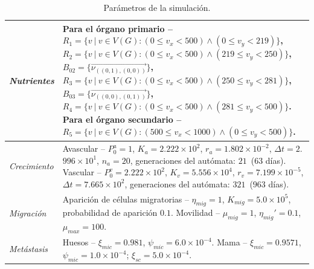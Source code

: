 \begin{appendixes}
\begin{table}[!ht]
\begin{center}
{\begin{tabular}{|p{2.5cm}|p{14cm}|}
    \emph{Nutrientes} & Para el \'organo primario -- $R_1 = \lbrace v~|~v \in V(G) : (0 \leq v_x < 500) \wedge (0 \leq v_y < 219) \rbrace$, $R_2 = \lbrace v~|~v \in V(G) : (0 \leq v_x < 500) \wedge (219 \leq v_y < 250) \rbrace$, $B_{02}=\lbrace \overrightarrow{\nu_{((0,1),(0,0))}} \rbrace$, $R_3 = \lbrace v~|~v \in V(G) : (0 \leq v_x < 500) \wedge (250 \leq v_y < 281) \rbrace$, $B_{03}=\lbrace \overrightarrow{\nu_{((0,0),(0,1))}} \rbrace$, $R_4 = \lbrace v~|~v \in V(G) : (0 \leq v_x < 500) \wedge (281 \leq v_y < 500) \rbrace$. Para el \'organo secundario -- $R_5 = \lbrace v~|~v \in V(G) : (500 \leq v_x < 1000) \wedge (0 \leq v_y < 500) \rbrace$.\\\hline
    
    \emph{Crecimiento} & Avascular -- $P_0^a=1$, $K_a=2$.$222 \times 10^2$, $r_a=1$.$802 \times 10^{-2}$, $\Delta t=2$.$996 \times 10^1$, $n_a=20$, generaciones del aut\'omata: $21$~($63$ d\'ias). Vascular -- $P_0^v=2$.$222 \times 10^2$, $K_v=5$.$556 \times 10^4$, $r_v=7$.$199 \times 10^{-5}$, $\Delta t=7$.$665 \times 10^2$, generaciones del aut\'omata: $321$~($963$ d\'ias).\\\hline
    
    \emph{Migraci\'on} & Aparici\'on de c\'elulas migratorias -- $\eta_{mig}=1$, $K_{mig}=5$.$0 \times 10^5$, probabilidad de aparici\'on $0$.$1$. Movilidad -- $\mu_{mig}=1$, $\eta_{mig}'=0$.$1$, $\mu_{max}=100$.\\\hline
    
    \emph{Met\'astasis} & Huesos -- $\xi_{mic} = 0$.$981$, $\psi_{mic} = 6$.$0 \times 10^{-4}$. Mama -- $\xi_{mic} = 0$.$9571$, $\psi_{mic} = 1$.$0 \times 10^{-4}$; $\xi_{sc} = 5$.$0 \times 10^{-4}$. \\\hline
    \end{tabular}}
    \end{center}\vspace*{-0.6cm}
    \caption[Ap\'endice E: par\'ametros de la simulaci\'on]{Par\'ametros de la simulaci\'on.}
    \end{table}
    

\end{appendixes}
